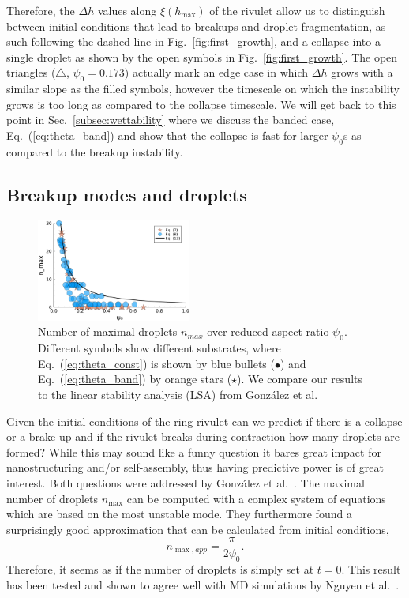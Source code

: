 \documentclass[twoside,twocolumn,9pt]{article}
\begin{document}
Therefore, the $\Delta h$ values along $\xi(h_{\max})$ of the rivulet allow us to distinguish between initial conditions that lead to breakups and droplet fragmentation, as such following the dashed line in Fig.~\ref{fig:first_growth}, and a collapse into a single droplet as shown by the open symbols in Fig.~\ref{fig:first_growth}.
The open triangles ($\triangle$, $\psi_0 = 0.173$) actually mark an edge case in which $\Delta h$ grows with a similar slope as the filled symbols, however the timescale on which the instability grows is too long as compared to the collapse timescale. 
We will get back to this point in Sec.~\ref{subsec:wettability} where we discuss the banded case, Eq.~(\ref{eq:theta_band}) and show that the collapse is fast for larger $\psi_0$s as compared to the breakup instability.

\subsection{Breakup modes and droplets}\label{subsec:drop-counting}
\begin{figure}
    \centering
    \includegraphics[width=0.45\textwidth]{assets/maxdropsUniBand.pdf}
    \caption{Number of maximal droplets $n_{max}$ over reduced aspect ratio $\psi_0$.
    Different symbols show different substrates, where Eq.~(\ref{eq:theta_const}) is shown by blue bullets (\textcolor{jlblue}{$\bullet$}) and Eq.~(\ref{eq:theta_band}) by orange stars (\textcolor{jlorange}{$\star$}).
    We compare our results to the linear stability analysis (LSA) from Gonz{\'a}lez et al.~\cite{gonzalezStabilityLiquidRing2013}}
    \label{fig:max_drops}
\end{figure}

Given the initial conditions of the ring-rivulet can we predict if there is a collapse or a brake up and if the rivulet breaks during contraction how many droplets are formed?
While this may sound like a funny question it bares great impact for nanostructuring and/or self-assembly, thus having predictive power is of great interest.
Both questions were addressed by Gonz{\'a}lez et al.~\cite{gonzalezStabilityLiquidRing2013}. 
The maximal number of droplets $n_{\max}$ can be computed with a complex system of equations which are based on the most unstable mode.
They furthermore found a surprisingly good approximation that can be calculated from initial conditions, 
\begin{equation}\label{eq:maxDrops}
    n_{\max, app} = \frac{\pi}{2\psi_0}.
\end{equation}
Therefore, it seems as if the number of droplets is simply set at $t=0$.
This result has been tested and shown to agree well with MD simulations by Nguyen et al.~\cite{nguyenCompetitionCollapseBreakup2012}. 
\end{document}
